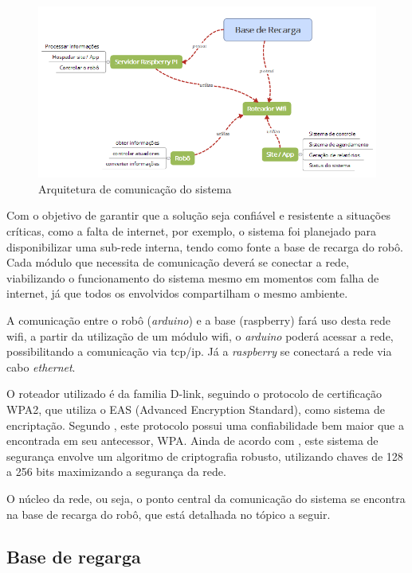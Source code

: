 	\begin{figure}[H]
		\centering
		\includegraphics[scale=0.8]{figuras/arquitetura_comunicacao.png}
		\caption{Arquitetura de comunicação do sistema}
		\label{img:arq_comu}
	\end{figure}

	Com o objetivo de garantir que a solução seja confiável e resistente a situações críticas, como a falta de internet, por exemplo, o sistema foi planejado para disponibilizar uma sub-rede interna, tendo como fonte a base de recarga do robô. Cada módulo que necessita de comunicação deverá se conectar a rede, viabilizando o funcionamento do sistema mesmo em momentos com falha de internet, já que todos os envolvidos compartilham o mesmo ambiente.

	A comunicação entre o robô (\textit{arduino}) e a base (raspberry) fará uso desta rede wifi, a partir da utilização de um módulo wifi, o \textit{arduino} poderá acessar a rede, possibilitando a comunicação via tcp/ip. Já a \textit{raspberry} se conectará a rede via cabo \textit{ethernet}.

	O roteador utilizado é da familia D-link, seguindo o protocolo de certificação WPA2, que utiliza o EAS (Advanced Encryption Standard), como sistema de encriptação. Segundo \cite{wpa2}, este protocolo possui uma confiabilidade bem maior que a encontrada em seu antecessor, WPA. Ainda de acordo com \cite{wpa2}, este sistema de segurança envolve um algoritmo de criptografia robusto, utilizando chaves de 128 a 256 bits maximizando a segurança da rede.


	O núcleo da rede, ou seja, o ponto central da comunicação do sistema se encontra na base de recarga do robô, que está detalhada no tópico a seguir.

	\subsection{Base de regarga}


